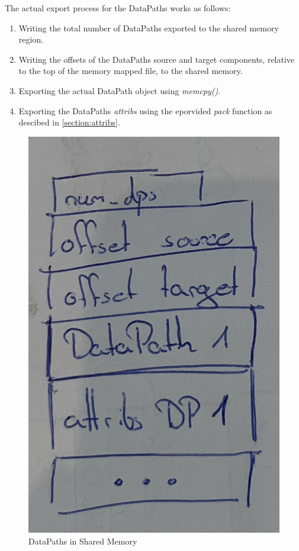 The actual export process for the DataPaths works as follows:

\begin{enumerate}
    \item Writing the total number of DataPaths exported to the shared memory region.
    \item Writing the offsets of the DataPaths source and target components, relative to the top of the memory mapped file, to the shared memory.
    \item Exporting the actual DataPath object using \emph{memcpy()}.
    \item Exporting the DataPaths \emph{attribs} using the eporvided \emph{pack} function as descibed in \autoref{section:attribs}.
\end{enumerate}

\begin{figure}[!ht] %
    \includegraphics[scale=0.15]{images/export_dps.jpg} %
    \centering
    \caption{DataPaths in Shared Memory}
    \label{figure:export_dps}
\end{figure}

